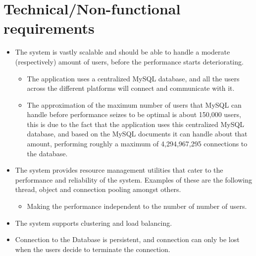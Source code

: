\documentclass[10pt,a4paper]{article}
\begin{document}
\section{Technical/Non-functional requirements}

                               \begin{itemize}
                                                \item The system is vastly scalable and should be able to handle a moderate (respectively) amount of users, before the performance starts deteriorating.
                                                \begin{itemize}
                                                                \item The application uses a centralized MySQL database, and all the users across the different platforms will connect and communicate with it. 
                                                                \item The approximation of the maximum number of users that MySQL can handle before performance seizes to be optimal is about 150,000 users, this is due to the fact that the application uses this centralized MySQL database, and based on the MySQL documents it can handle about that amount, performing roughly a maximum of 4,294,967,295 connections to the database. 
                                                \end{itemize}
                                \end{itemize}
                \begin{itemize}
                        \item The system provides resource management utilities that cater to the performance and reliability of the system. Examples of these are the following thread, object and connection pooling amongst others.
                        \begin{itemize}
                                \item Making the performance independent to the number of number of users.
                        \end{itemize}
                \end{itemize}
                \begin{itemize}
                        \item The system supports clustering and load balancing.
                \end{itemize}
                \begin{itemize}
                        \item Connection to the Database is persistent, and connection can only be lost when the users decide to terminate the connection.\\
                \end{itemize}
\end{document}
